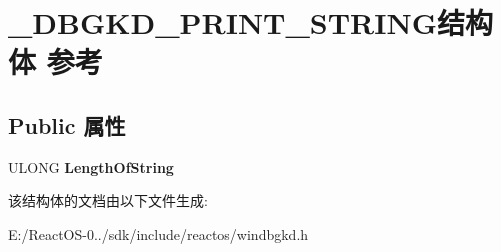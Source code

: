 \hypertarget{struct___d_b_g_k_d___p_r_i_n_t___s_t_r_i_n_g}{}\section{\+\_\+\+D\+B\+G\+K\+D\+\_\+\+P\+R\+I\+N\+T\+\_\+\+S\+T\+R\+I\+N\+G结构体 参考}
\label{struct___d_b_g_k_d___p_r_i_n_t___s_t_r_i_n_g}
\subsection*{Public 属性}
\begin{DoxyCompactItemize}
\item 
\mbox{\label{struct___d_b_g_k_d___p_r_i_n_t___s_t_r_i_n_g_a310725bf4a637db99df47896f5613fe5}} 
U\+L\+O\+NG {\bfseries Length\+Of\+String}
\end{DoxyCompactItemize}


该结构体的文档由以下文件生成\+:\begin{DoxyCompactItemize}
\item 
E\+:/\+React\+O\+S-\/0../sdk/include/reactos/windbgkd.\+h\end{DoxyCompactItemize}
